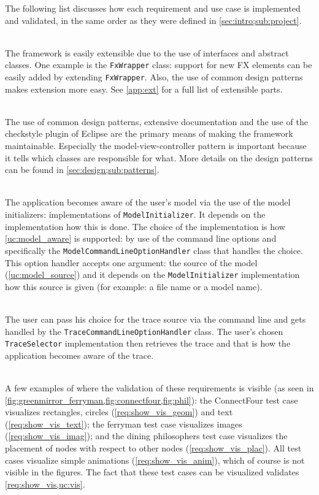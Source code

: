 \par The following list discusses how each requirement and use case is implemented and validated, in the same order as they were defined in \cref{sec:intro;sub:project}.
\begin{description}
\item\textbf{}\\The framework is easily extensible due to the use of interfaces and abstract classes. One example is the \lstinline{FxWrapper} class: support for new FX elements can be easily added by extending \lstinline{FxWrapper}. Also, the use of common design patterns makes extension more easy. See \cref{app:ext} for a full list of extensible parts.
\item\textbf{}\\The use of common design patterns, extensive documentation and the use of the checkstyle plugin of Eclipse are the primary means of making the framework maintainable. Especially the model-view-controller pattern is important because it tells which classes are responsible for what. More details on the design patterns can be found in \cref{sec:design;sub:patterns}.
\item\textbf{}\\The application becomes aware of the user's model via the use of the model initializers: implementations of \lstinline{ModelInitializer}. It depends on the implementation how this is done. The choice of the implementation is how \cref{uc:model_aware} is supported: by use of the command line options and specifically the \lstinline{ModelCommandLineOptionHandler} class that handles the choice. This option handler accepts one argument: the source of the model (\cref{uc:model_source}) and it depends on the \lstinline{ModelInitializer} implementation how this source is given (for example: a file name or a model name).
\item\textbf{}\\The user can pass his choice for the trace source via the command line and gets handled by the \lstinline{TraceCommandLineOptionHandler} class. The user's chosen \lstinline{TraceSelector} implementation then retrieves the trace and that is how the application becomes aware of the trace.
\item\textbf{}\\A few examples of where the validation of these requirements is visible (as seen in \cref{fig:greenmirror_ferryman,fig:connectfour,fig:phil}): the ConnectFour test case visualizes rectangles, circles (\cref{req:show_vis_geom}) and text (\cref{req:show_vis_text}); the ferryman test case visualizes images (\cref{req:show_vis_imag}); and the dining philosophers test case visualizes the placement of nodes with respect to other nodes (\cref{req:show_vis_plac}). All test cases visualize simple animations (\cref{req:show_vis_anim}), which of course is not visible in the figures. The fact that these test cases can be visualized validates \cref{req:show_vis,uc:vis}.

\end{description}
